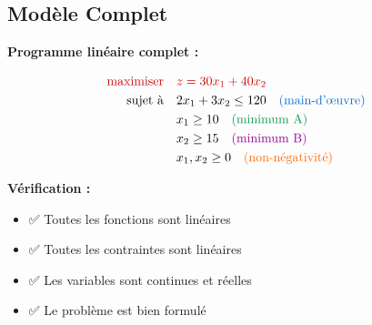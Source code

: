 \documentclass[12pt,a4paper]{article}
\begin{document}
\newpage
\subsection{Modèle Complet}

\begin{solution}
\textbf{Programme linéaire complet :}

\begin{align*}
\text{\textcolor{importantrouge}{maximiser}} \quad & \textcolor{importantrouge}{z = 30x_1 + 40x_2}\\
\text{sujet à} \quad & 2x_1 + 3x_2 \leq 120 \quad \textcolor{titrebleu}{\text{(main-d'œuvre)}}\\
& x_1 \geq 10 \quad \textcolor{defvert}{\text{(minimum A)}}\\
& x_2 \geq 15 \quad \textcolor{algoviolet}{\text{(minimum B)}}\\
& x_1, x_2 \geq 0 \quad \textcolor{exempleorange}{\text{(non-négativité)}}
\end{align*}
\end{solution}

\begin{remarque}
\textbf{Vérification :}
\begin{itemize}
    \item ✅ Toutes les fonctions sont linéaires
    \item ✅ Toutes les contraintes sont linéaires
    \item ✅ Les variables sont continues et réelles
    \item ✅ Le problème est bien formulé
\end{itemize}
\end{remarque}
\end{document}
